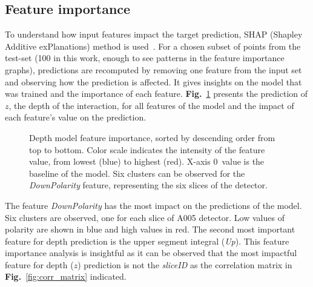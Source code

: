 \subsection{Feature importance}

To understand how input features impact the target prediction, SHAP (Shapley Additive exPlanations) method is used~\cite{lundberg2017}. For a chosen subset of points from the test-set (100 in this work, enough to see patterns in the feature importance graphs), predictions are recomputed by removing one feature from the input set and observing how the prediction is affected. It gives insights on the model that was trained and the importance of each feature. \textbf{Fig.}~\ref{fig:detph_treeSHAP} presents the prediction of $z$, the depth of the interaction, for all features of the model and the impact of each feature's value on the prediction.

\begin{figure}
\centering
{}
\caption{Depth model feature importance, sorted by descending order from top to bottom. Color scale indicates the intensity of the feature value, from lowest (blue) to highest (red). X-axis 0~value is the baseline of the model. Six clusters can be observed for the \textit{DownPolarity} feature, representing the six slices of the detector.} 
\label{fig:detph_treeSHAP}       %
\end{figure}

The feature \textit{DownPolarity} has the most impact on the predictions of the model. Six clusters are observed, one for each slice of A005 detector. Low values of polarity are shown in blue and high values in red. The second most important feature for depth prediction is the upper segment integral (\textit{Up}). This feature importance analysis is insightful as it can be observed that the most impactful feature for depth ($z$) prediction is not the \textit{sliceID} as the correlation matrix in \textbf{Fig.}~\ref{fig:corr_matrix} indicated.

